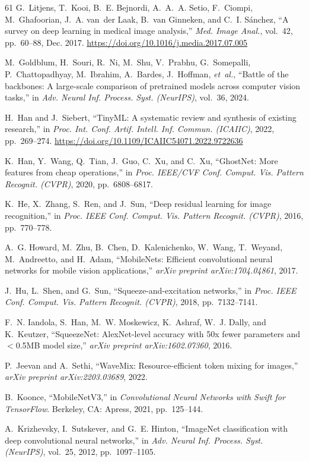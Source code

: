 ﻿\documentclass[journal]{IEEEtran}
\providecommand{\doi}[1]{\url{https://doi.org/#1}}
\begin{document}
\begin{thebibliography}{61}
G.~Litjens, T.~Kooi, B.~E. Bejnordi, A.~A.~A. Setio, F.~Ciompi, M.~Ghafoorian, J.~A. van~der Laak, B.~van Ginneken, and C.~I. S{\'a}nchez, ``A survey on deep learning in medical image analysis,'' \emph{Med. Image Anal.}, vol.~42, pp.~60--88, Dec. 2017. \doi{10.1016/j.media.2017.07.005}

M.~Goldblum, H.~Souri, R.~Ni, M.~Shu, V.~Prabhu, G.~Somepalli, P.~Chattopadhyay, M.~Ibrahim, A.~Bardes, J.~Hoffman, \emph{et~al.}, ``Battle of the backbones: A large-scale comparison of pretrained models across computer vision tasks,'' in \emph{Adv. Neural Inf. Process. Syst. (NeurIPS)}, vol.~36, 2024.

H.~Han and J.~Siebert, ``TinyML: A systematic review and synthesis of existing research,'' in \emph{Proc. Int. Conf. Artif. Intell. Inf. Commun. (ICAIIC)}, 2022, pp.~269--274. \doi{10.1109/ICAIIC54071.2022.9722636}

K.~Han, Y.~Wang, Q.~Tian, J.~Guo, C.~Xu, and C.~Xu, ``GhostNet: More features from cheap operations,'' in \emph{Proc. IEEE/CVF Conf. Comput. Vis. Pattern Recognit. (CVPR)}, 2020, pp.~6808--6817.

K.~He, X.~Zhang, S.~Ren, and J.~Sun, ``Deep residual learning for image recognition,'' in \emph{Proc. IEEE Conf. Comput. Vis. Pattern Recognit. (CVPR)}, 2016, pp.~770--778.

A.~G. Howard, M.~Zhu, B.~Chen, D.~Kalenichenko, W.~Wang, T.~Weyand, M.~Andreetto, and H.~Adam, ``MobileNets: Efficient convolutional neural networks for mobile vision applications,'' \emph{arXiv preprint arXiv:1704.04861}, 2017.

J.~Hu, L.~Shen, and G.~Sun, ``Squeeze-and-excitation networks,'' in \emph{Proc. IEEE Conf. Comput. Vis. Pattern Recognit. (CVPR)}, 2018, pp.~7132--7141.

F.~N. Iandola, S.~Han, M.~W. Moskewicz, K.~Ashraf, W.~J. Dally, and K.~Keutzer, ``SqueezeNet: AlexNet-level accuracy with 50x fewer parameters and $<$0.5MB model size,'' \emph{arXiv preprint arXiv:1602.07360}, 2016.

P.~Jeevan and A.~Sethi, ``WaveMix: Resource-efficient token mixing for images,'' \emph{arXiv preprint arXiv:2203.03689}, 2022.

B.~Koonce, ``MobileNetV3,'' in \emph{Convolutional Neural Networks with Swift for TensorFlow}. Berkeley, CA: Apress, 2021, pp.~125--144.

A.~Krizhevsky, I.~Sutskever, and G.~E. Hinton, ``ImageNet classification with deep convolutional neural networks,'' in \emph{Adv. Neural Inf. Process. Syst. (NeurIPS)}, vol.~25, 2012, pp.~1097--1105.


\end{thebibliography}
\end{document}
